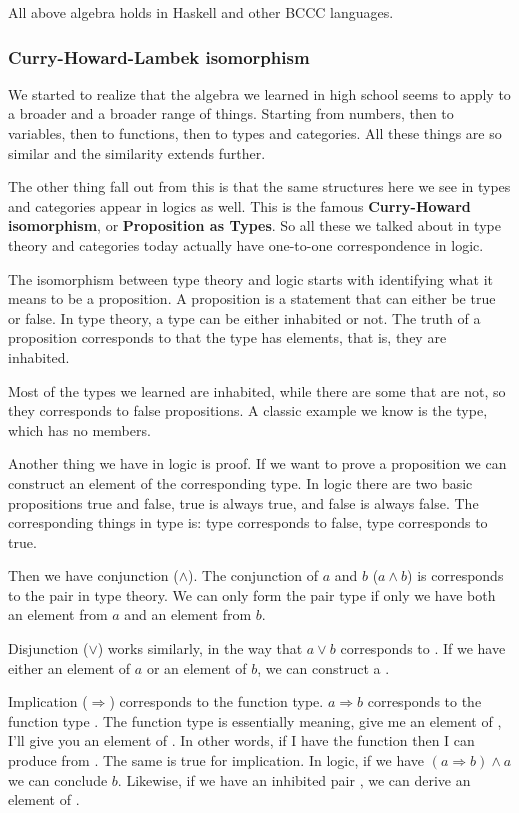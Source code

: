 All above algebra holds in Haskell and other BCCC languages.


\subsubsection{Curry-Howard-Lambek isomorphism}

We started to realize that the algebra we learned in high school seems to apply
to a broader and a broader range of things. Starting from numbers, then to variables,
then to functions, then to types and categories. All these things are so similar
and the similarity extends further.

The other thing fall out from this is that the same structures here we see in
types and categories appear in logics as well. This is the famous
\textbf{Curry-Howard isomorphism}, or \textbf{Proposition as Types}. So all
these we talked about in type theory and categories today actually have
one-to-one correspondence in logic.

The isomorphism between type theory and logic starts with identifying what it
means to be a proposition. A proposition is a statement that can either be true
or false. In type theory, a type can be either inhabited or not. The truth of a
proposition corresponds to that the type has elements, that is, they are
inhabited.

Most of the types we learned are inhabited, while there are some that are not,
so they corresponds to false propositions. A classic example we know is the
 type, which has no members.

Another thing we have in logic is proof. If we want to prove a proposition we
can construct an element of the corresponding type. In logic there are two basic
propositions true and false, true is always true, and false is always false. The
corresponding things in type is:  type corresponds to false,
 type corresponds to true.

Then we have conjunction ($\land$). The conjunction of $a$ and $b$ ($a\land b$)
is corresponds to the pair  in type theory. We can only form the
pair type if only we have both an element from $a$ and an element from $b$.

Disjunction ($\lor$) works similarly, in the way that $a \lor b$ corresponds to
. If we have either an element of $a$ or an element of $b$, we
can construct a .

Implication ($\Rightarrow$) corresponds to the function type. $a \Rightarrow b$
corresponds to the function type . The function type 
is essentially meaning, give me an element of , I'll give you an element
of . In other words, if I have the function then I can produce 
from . The same is true for implication. In logic, if we have
$(a\Rightarrow b) \land a$ we can conclude $b$. Likewise, if we have an
inhibited pair , we can derive an element of .


